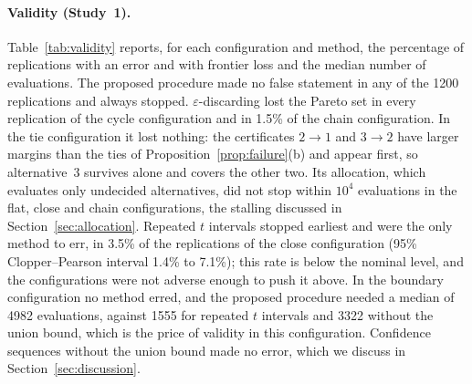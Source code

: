 \paragraph{Validity (Study~1).} Table~\ref{tab:validity} reports, for each configuration and method, the percentage of replications with an error and with frontier loss and the median number of evaluations. The proposed procedure made no false statement in any of the 1200 replications and always stopped. $\varepsilon$-discarding lost the Pareto set in every replication of the cycle configuration and in 1.5\% of the chain configuration. In the tie configuration it lost nothing: the certificates $2\to1$ and $3\to2$ have larger margins than the ties of Proposition~\ref{prop:failure}(b) and appear first, so alternative~3 survives alone and covers the other two. Its allocation, which evaluates only undecided alternatives, did not stop within $10^4$ evaluations in the flat, close and chain configurations, the stalling discussed in Section~\ref{sec:allocation}. Repeated $t$ intervals stopped earliest and were the only method to err, in 3.5\% of the replications of the close configuration (95\% Clopper--Pearson interval 1.4\% to 7.1\%); this rate is below the nominal level, and the configurations were not adverse enough to push it above. In the boundary configuration no method erred, and the proposed procedure needed a median of 4982 evaluations, against 1555 for repeated $t$ intervals and 3322 without the union bound, which is the price of validity in this configuration. Confidence sequences without the union bound made no error, which we discuss in Section~\ref{sec:discussion}.

\begin{table}[tbp]
\centering
\caption{Study~1: percentage of the 200 replications with an error (Err.) and with frontier loss (Loss), and median number of evaluations (Eval.); in parentheses, the percentage that stopped within $10^4$ evaluations when below 100. With 200 replications, the upper 95\% Clopper--Pearson limit for an observed rate of zero is 1.8\%.}
\label{tab:validity}
\footnotesize

\end{table}

